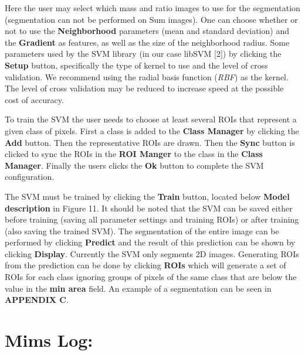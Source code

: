 \documentclass{article}
\begin{document}
	Here the user may select which mass and ratio images to use for the segmentation 
	(segmentation can not be performed on Sum images).  One can choose whether or not 
	to use the \textbf{Neighborhood} parameters (mean and standard deviation) and the 
	\textbf{Gradient} as features, as well as the size of the neighborhood radius. 
	Some parameters used by the SVM library (in our case libSVM [2]) by clicking the 
	\textbf{Setup} button, specifically the type of kernel to use and the level of 
	cross validation.  We recommend using the radial basis function (\textit{RBF}) 
	as the kernel.  The level of cross validation may be reduced to increase speed 
	at the possible cost of accuracy.

	To train the SVM the user needs to choose at least several ROIs that represent 
	a given class of pixels. First a class is added to the \textbf{Class Manager} 
	by clicking the \textbf{Add} button.  Then the representative ROIs are drawn.  
	Then the \textbf{Sync} button is clicked to sync the ROIs in the \textbf{ROI Manger} 
	to the class in the \textbf{Class Manager}. Finally the users clicks the \textbf{Ok} 
	button to complete the SVM configuration.


\newpage
	The SVM must be trained by clicking the \textbf{Train} button, located below 
	\textbf{Model description} in Figure 11.  It should be noted that the SVM can 
	be saved either before training (saving all parameter settings and training ROIs) 
	or after training (also saving the trained SVM).  The segmentation of the entire 
	image can be performed by clicking \textbf{Predict} and the result of this 
	prediction can be shown by clicking \textbf{Display}. Currently the SVM only 
	segments 2D images. Generating ROIs from the prediction can be done by clicking 
	\textbf{ROIs} which will generate a set of ROIs for each class ignoring groups 
	of pixels of the same class that are below the value in the \textbf{min area} 
	field. An example of a segmentation can be seen in \textbf{APPENDIX C}.

\newpage
\section*{Mims Log:}
	
\end{document}
